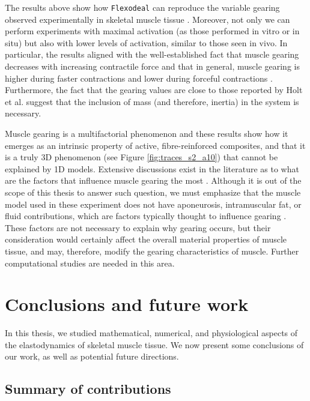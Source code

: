 \documentclass{sfuthesis}
\numberwithin{equation}{section}
\numberwithin{figure}{chapter}
\numberwithin{table}{chapter}
\theoremstyle{definition}
\begin{document}
The results above show how \texttt{Flexodeal} can reproduce the variable gearing observed experimentally in skeletal muscle tissue \cite{Azizi2008VariableGearing}. Moreover, not only we can perform experiments with maximal activation (as those performed in vitro or in situ) but also with lower levels of activation, similar to those seen in vivo. In particular, the results aligned with the well-established fact that muscle gearing decreases with increasing contractile force \cite{Eng2018} and that in general, muscle gearing is higher during faster contractions and lower during forceful contractions \cite{Azizi2008VariableGearing,Eng2018,Holt2016,RobertsEtAl2019MutiScale3DNature}. Furthermore, the fact that the gearing values are close to those reported by Holt et al. \cite{Holt2016} suggest that the inclusion of mass (and therefore, inertia) in the system is necessary.

Muscle gearing is a multifactorial phenomenon and these results show how it emerges as an intrinsic property of active, fibre-reinforced composites, and that it is a truly 3D phenomenon (see Figure \ref{fig:traces_s2_a10}) that cannot be explained by 1D models. Extensive discussions exist in the literature as to what are the factors that influence muscle gearing the most \cite{Eng2018}.
Although it is out of the scope of this thesis to answer such question, we must emphasize that the muscle model used in these experiment does not have aponeurosis, intramuscular fat, or fluid contributions, which are factors typically thought to influence gearing \cite{AziziGillisBrainerd2002,BrainerdAzizi2005,Eng2018,Holt2016}. These factors are not necessary to explain why gearing occurs, but their consideration would certainly affect the overall material properties of muscle tissue, and may, therefore, modify the gearing characteristics of muscle. Further computational studies are needed in this area.


\chapter{Conclusions and future work}

In this thesis, we studied mathematical, numerical, and physiological aspects of the elastodynamics of skeletal muscle tissue. We now present some conclusions of our work, as well as potential future directions.

\section{Summary of contributions}
\end{document}

